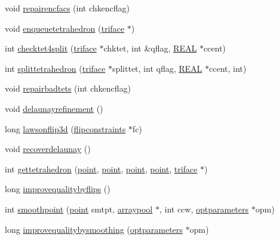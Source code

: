 \begin{DoxyCompactItemize}
\item 
void \hyperlink{classtetgenmesh_a701d4f317ed66df6a2e2b7b237e2386a}{repairencfacs} (int chkencflag)
\item 
void \hyperlink{classtetgenmesh_a86e87c56bd1717f1741adca87cb21acb}{enqueuetetrahedron} (\hyperlink{classtetgenmesh_1_1triface}{triface} $\ast$)
\item 
int \hyperlink{classtetgenmesh_ad4bfeb6c3c912f5d59f3e7784df98517}{checktet4split} (\hyperlink{classtetgenmesh_1_1triface}{triface} $\ast$chktet, int \&qflag, \hyperlink{tetgen_8h_a4b654506f18b8bfd61ad2a29a7e38c25}{R\+E\+AL} $\ast$ccent)
\item 
int \hyperlink{classtetgenmesh_aa752155eb1d18550a212dd40297f122e}{splittetrahedron} (\hyperlink{classtetgenmesh_1_1triface}{triface} $\ast$splittet, int qflag, \hyperlink{tetgen_8h_a4b654506f18b8bfd61ad2a29a7e38c25}{R\+E\+AL} $\ast$ccent, int)
\item 
void \hyperlink{classtetgenmesh_a7c46c82d83099214115fa9719aefbd78}{repairbadtets} (int chkencflag)
\item 
void \hyperlink{classtetgenmesh_a477bbfde72103de66546d4ea3343b4a1}{delaunayrefinement} ()
\item 
long \hyperlink{classtetgenmesh_a6755cfa20d8ea6ce62d059750657a292}{lawsonflip3d} (\hyperlink{classtetgenmesh_1_1flipconstraints}{flipconstraints} $\ast$fc)
\item 
void \hyperlink{classtetgenmesh_a4f6f365744005e9d9da43a7d8a1fbba8}{recoverdelaunay} ()
\item 
int \hyperlink{classtetgenmesh_aeaa9ecb1ea77f736117b9dd6ee5855fc}{gettetrahedron} (\hyperlink{classtetgenmesh_ace3fb4f80389185b7c9b18ab69a3dea2}{point}, \hyperlink{classtetgenmesh_ace3fb4f80389185b7c9b18ab69a3dea2}{point}, \hyperlink{classtetgenmesh_ace3fb4f80389185b7c9b18ab69a3dea2}{point}, \hyperlink{classtetgenmesh_ace3fb4f80389185b7c9b18ab69a3dea2}{point}, \hyperlink{classtetgenmesh_1_1triface}{triface} $\ast$)
\item 
long \hyperlink{classtetgenmesh_a3d724f195ed9c3f5e1378d1f4f0c5282}{improvequalitybyflips} ()
\item 
int \hyperlink{classtetgenmesh_a8edf1b91719a1e64acd4fe8617184905}{smoothpoint} (\hyperlink{classtetgenmesh_ace3fb4f80389185b7c9b18ab69a3dea2}{point} smtpt, \hyperlink{classtetgenmesh_1_1arraypool}{arraypool} $\ast$, int ccw, \hyperlink{classtetgenmesh_1_1optparameters}{optparameters} $\ast$opm)
\item 
long \hyperlink{classtetgenmesh_a1d652618e67ac4ff3057373e15016181}{improvequalitybysmoothing} (\hyperlink{classtetgenmesh_1_1optparameters}{optparameters} $\ast$opm)

\end{DoxyCompactItemize}
